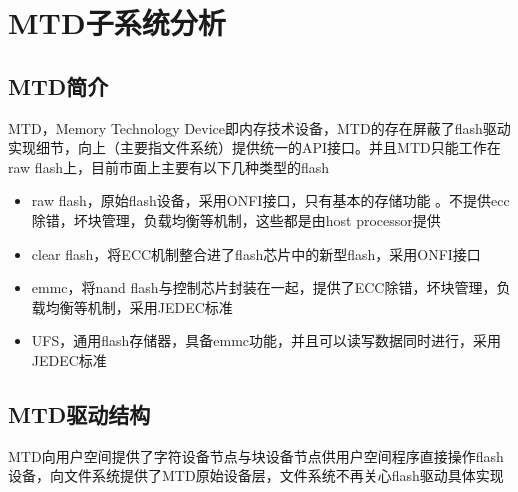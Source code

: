 \chapter{MTD子系统分析}
\section{MTD简介}
MTD，Memory Technology Device即内存技术设备，MTD的存在屏蔽了flash驱动实现细节，向上（主要指文件系统）提供统一的API接口。并且MTD只能工作在raw flash上，目前市面上主要有以下几种类型的flash
\begin{itemize}
  \item raw flash，原始flash设备，采用ONFI接口，只有基本的存储功能 。不提供ecc除错，坏块管理，负载均衡等机制，这些都是由host processor提供
  \item clear flash，将ECC机制整合进了flash芯片中的新型flash，采用ONFI接口
  \item emmc，将nand flash与控制芯片封装在一起，提供了ECC除错，坏块管理，负载均衡等机制，采用JEDEC标准 
  \item UFS，通用flash存储器，具备emmc功能，并且可以读写数据同时进行，采用JEDEC标准
\end{itemize}

\section{MTD驱动结构}
MTD向用户空间提供了字符设备节点与块设备节点供用户空间程序直接操作flash设备，向文件系统提供了MTD原始设备层，文件系统不再关心flash驱动具体实现

